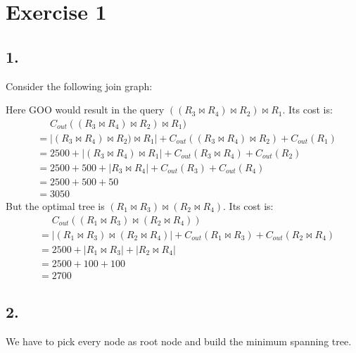 \documentclass{scrartcl}
\newcommand{\join}{\Join}
\begin{document}
\section*{Exercise 1}

\subsection*{1.}

Consider the following join graph:


Here GOO would result in the query $((R_3 \join R_4) \join R_2) \join R_1$. Its
cost is:
\begin{align*}
&\phantom{{}={}} C_{out}((R_3 \join R_4) \join R_2) \join R_1) \\
&= |(R_3 \join R_4) \join R_2) \join R_1| + C_{out}((R_3 \join R_4) \join R_2) +
C_{out}(R_1) \\
&= 2500 + |(R_3 \join R_4) \join R_1| + C_{out}(R_3 \join R_4) + C_{out}(R_2) \\
&= 2500 + 500 + |R_3 \join R_4| + C_{out}(R_3) + C_{out}(R_4) \\
&= 2500 + 500 + 50 \\
&= 3050
\end{align*}
But the optimal tree is $(R_1 \join R_3) \join (R_2 \join R_4)$. Its cost is:
\begin{align*}
&\phantom{{}={}} C_{out}((R_1 \join R_3) \join (R_2 \join R_4)) \\
&= |(R_1 \join R_3) \join (R_2 \join R_4)| + C_{out}(R_1 \join R_3) +
C_{out}(R_2 \join R_4) \\
&= 2500 + |R_1 \join R_3| + |R_2 \join R_4| \\
&= 2500 + 100 + 100 \\
&= 2700
\end{align*}

\subsection*{2.}

We have to pick every node as root node and build the minimum spanning tree.
\end{document}
